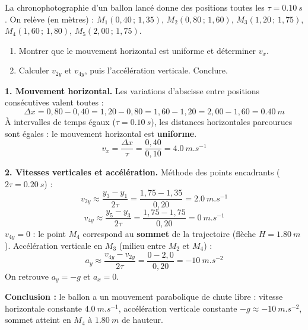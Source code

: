 \documentclass[11pt]{article}
\begin{document}
\begin{exoresolu}
La chronophotographie d'un ballon lancé donne des positions toutes les $\tau=\SI{0,10}{s}$. On relève (en mètres) :
$M_1(0,40\,;\,1,35)$, $M_2(0,80\,;\,1,60)$, $M_3(1,20\,;\,1,75)$, $M_4(1,60\,;\,1,80)$, $M_5(2,00\,;\,1,75)$.
\begin{enumerate}
\item Montrer que le mouvement horizontal est uniforme et déterminer $v_x$.
\item Calculer $v_{2y}$ et $v_{4y}$, puis l'accélération verticale. Conclure.
\end{enumerate}
\tcblower
\textbf{1. Mouvement horizontal.}
Les variations d'abscisse entre positions consécutives valent toutes :
\[ \Delta x = 0,80-0,40 = 1,20-0,80 = 1,60-1,20 = 2,00-1,60 = \SI{0,40}{m} \]
À intervalles de temps égaux ($\tau=\SI{0,10}{s}$), les distances horizontales parcourues sont égales : le mouvement horizontal est \textbf{uniforme}.
\[ v_x = \dfrac{\Delta x}{\tau} = \dfrac{0,40}{0,10} = \SI{4,0}{m.s^{-1}} \]

\textbf{2. Vitesses verticales et accélération.}
Méthode des points encadrants ($2\tau = \SI{0,20}{s}$) :
\[ v_{2y} \approx \dfrac{y_3-y_1}{2\tau} = \dfrac{1,75-1,35}{0,20} = \SI{2,0}{m.s^{-1}} \]
\[ v_{4y} \approx \dfrac{y_5-y_3}{2\tau} = \dfrac{1,75-1,75}{0,20} = \SI{0}{m.s^{-1}} \]
$v_{4y}=0$ : le point $M_4$ correspond au \textbf{sommet} de la trajectoire (flèche $H=\SI{1,80}{m}$).
Accélération verticale en $M_3$ (milieu entre $M_2$ et $M_4$) :
\[ a_y \approx \dfrac{v_{4y}-v_{2y}}{2\tau} = \dfrac{0-2,0}{0,20} = \SI{-10}{m.s^{-2}} \]
On retrouve $a_y=-g$ et $a_x=0$.

\textbf{Conclusion :} le ballon a un mouvement parabolique de chute libre : vitesse horizontale constante $\SI{4,0}{m.s^{-1}}$, accélération verticale constante $-g\approx\SI{-10}{m.s^{-2}}$, sommet atteint en $M_4$ à $\SI{1,80}{m}$ de hauteur.
\end{exoresolu}
\end{document}
